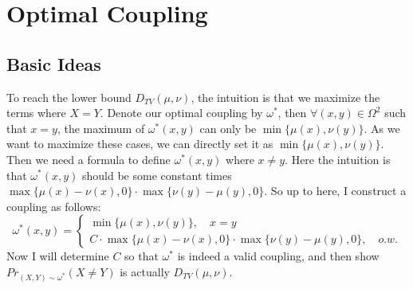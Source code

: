 \documentclass[12pt,letterpaper]{article}
\begin{document}
\section{Optimal Coupling}
\subsection{Basic Ideas}
To reach the lower bound $D_{TV}(\mu,\nu)$, the intuition is that we maximize the terms where $X=Y$. Denote our optimal coupling by $\omega^*$, then $\forall (x,y)\in\Omega^2$ such that $x=y$, the maximum of $\omega^*(x,y)$ can only be $\min\{\mu(x),\nu(y)\}$. As we want to maximize these cases, we can directly set it as $\min\{\mu(x),\nu(y)\}$.\\
Then we need a formula to define $\omega^*(x,y)$ where $x\neq y$. Here the intuition is that $\omega^*(x,y)$ should be some constant times $\max\{\mu(x)-\nu(x),0\}\cdot\max\{\nu(y)-\mu(y),0\}$. So up to here, I construct a coupling as follows:\\
$$\omega^*(x,y)=\begin{cases}
\min\{\mu(x),\nu(y)\},\quad x=y\\
C\cdot\max\{\mu(x)-\nu(x),0\}\cdot\max\{\nu(y)-\mu(y),0\},\quad o.w.
\end{cases}$$
Now I will determine $C$ so that $\omega^*$ is indeed a valid coupling, and then show $Pr_{(X,Y)\sim\omega^*}(X\neq Y)$ is actually $D_{TV}(\mu,\nu)$.
\end{document}

